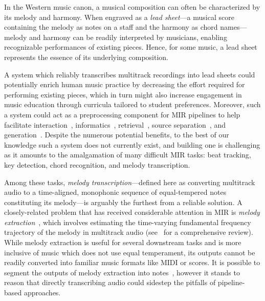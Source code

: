 \documentclass{article}
\begin{document}
In the Western music canon, 
a musical composition can often be characterized by its melody and harmony. 
When engraved as a \emph{lead sheet}---a musical score containing the melody as notes on a staff and the harmony as chord names---melody and harmony can be readily interpreted by musicians, enabling recognizable performances of existing pieces. 
Hence, for some music, a lead sheet represents the essence of its underlying composition.

A system which reliably transcribes multitrack recordings into lead sheets could potentially enrich human music practice by
decreasing the effort required for performing existing pieces, 
which in turn might also increase engagement in music education through curricula tailored to student preferences. 
Moreover, such a system could act as a preprocessing component for MIR pipelines to help facilitate 
interaction~\cite{},
informatics~\cite{bainbridge1999towards}, 
retrieval~\cite{}, 
source separation~\cite{ewert2014score}, 
and generation~\cite{hawthorne2019enabling}. 
Despite the numerous potential benefits, 
to the best of our knowledge such a system does not currently exist, 
and building one is challenging as it amounts to the amalgamation of many difficult MIR tasks: 
beat tracking, 
key detection, 
chord recognition, 
and melody transcription.

Among these tasks, 
\emph{melody transcription}---defined here as converting multitrack audio to a time-aligned, monophonic sequence of equal-tempered notes constituting its melody---is arguably the furthest from a reliable solution. 
A closely-related problem that has received considerable attention in MIR is \emph{melody extraction}~\cite{goto2000robust}, 
which involves estimating the time-varying fundamental frequency trajectory of the melody in multitrack audio (see~\cite{salamon2014melody} for a comprehensive review). 
While melody extraction is useful for several downstream tasks and is more inclusive of music which does not use equal temperament, 
its outputs cannot be readily converted into familiar music formats like MIDI or scores. 
It is possible to segment the outputs of melody extraction into notes~\cite{nishikimi2016musical}, 
however it stands to reason that directly transcribing audio could sidestep the pitfalls of pipeline-based approaches. 
\end{document}

